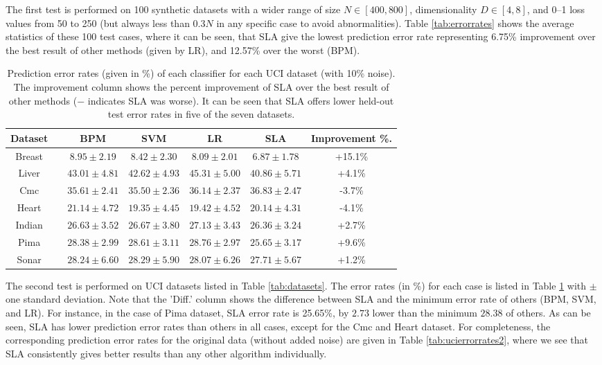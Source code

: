 The first test is performed on 100 synthetic datasets with a wider
range of size $N \in [400, 800]$, dimensionality $D \in [4, 8]$, and
0--1 loss values from 50 to 250 (but always less than $0.3 N$ in any
specific case to avoid abnormalities). Table \ref{tab:errorrates}
shows the average statistics of these 100 test cases, where it can be
seen, that SLA give the lowest prediction error rate representing
6.75\% improvement over the best result of other methods (given by
LR), and 12.57\% over the worst (BPM).

\begin{table}[htbp!]
\centering
{\footnotesize 
\begin{tabular}{|cc|  ccc|c|c|}
\hline\hline
{\bf Dataset} && {\bf BPM} & {\bf SVM} & {\bf LR} & {\bf SLA} & {\bf Improvement \%.}\\  
\hline
Breast && $8.95 \pm 2.19$ & $8.42 \pm 2.30$ & $8.09 \pm 2.01$ & $6.87 \pm 1.78$ & +15.1\%\\  
Liver && $43.01 \pm 4.81$ & $42.62 \pm 4.93$ & $45.31 \pm 5.00$ & $40.86 \pm 5.71$ & +4.1\%\\  
Cmc && $35.61 \pm 2.41$ & $35.50 \pm 2.36$ & $36.14 \pm 2.37$ & $36.83 \pm 2.47$ & -3.7\%\\  
Heart && $21.14 \pm 4.72$ & $19.35 \pm 4.45$ & $19.42 \pm 4.52$ & $20.14 \pm 4.31$ & -4.1\%\\  
Indian && $26.63 \pm 3.52$ & $26.67 \pm 3.80$ & $27.13 \pm 3.43$ & $26.36 \pm 3.24$ & +2.7\%\\  
Pima && $28.38 \pm 2.99$ & $28.61 \pm 3.11$ & $28.76 \pm 2.97$ & $25.65 \pm 3.17$ & +9.6\%\\  
Sonar && $28.24 \pm 6.60$ & $28.29 \pm 5.90$ & $28.07 \pm 6.26$ & $27.71 \pm 5.67$ & +1.2\%\\[1ex]   
\hline\hline
\end{tabular}}
\caption{Prediction error rates (given in \%) of each classifier for
  each UCI dataset (with 10\% noise). The improvement column shows the
  percent improvement of SLA over the best result of other methods ($-$
  indicates SLA was worse). It can be seen that SLA offers lower held-out
  test error rates in five of the seven datasets.}
\label{tab:ucierrorrates}
\end{table}

The second test is performed on UCI datasets listed in Table
\ref{tab:datasets}. The error rates (in \%) for each case is listed in
Table \ref{tab:ucierrorrates} with $\pm$ one standard deviation. Note
that the 'Diff.' column shows the difference between SLA and the
minimum error rate of others (BPM, SVM, and LR). For instance, in the
case of Pima dataset, SLA error rate is 25.65\%, by $2.73$ lower than
the minimum $28.38$ of others. As can be seen, SLA has lower
prediction error rates than others in all cases, except for the Cmc
and Heart dataset. For completeness, the corresponding prediction
error rates for the original data (without added noise) are given in
Table \ref{tab:ucierrorrates2}, where we see that SLA consistently
gives better results than any other algorithm individually. 
